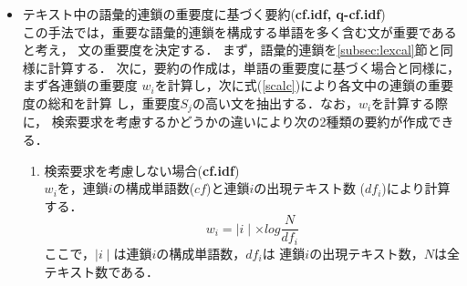 \begin{itemize}
テキスト中の単語の出現頻度から各単語の重要度を決定し，重要な単語を多く含む
文が重要であるという考えに基づき，文の重要度を計算する．
本稿ではZechner\cite{Zechner:96}と同様の手法を用いる．まず，テキスト中の各
単語の重要度$w_{i}$を計算する．次に，各文中の単語の重要度の総和を式
(\ref{scalc})により計算し，重要度$S_{j}$の高い文を抽出する．
	\begin{equation}\label{scalc}
		\displaystyle{S_{j}=\sum_{i} w_{i}}
		\end{equation}
この手法では，各単語の重要度$w_{i}$を計算する際に，検索要求を考慮
するかどうかの違いにより次の2種類の要約を作成できる．
	\begin{enumerate}
	\item 検索要求を考慮しない場合({\bf tf.idf})\\
	式(\ref{equ:tfidf})により，tf.idfを基に$w_{i}$を計算する．
	ただし，この場合の$tf_{i}$はテキスト内の単語$i$の出現頻度，$df_{i}$
	は単語$i$の出現するテキストの数，$N$は全テキスト数である．
	\item 検索要求を考慮する場合({\bf q-tf.idf})\\
	検索要求内の単語(検索語)には重み$\alpha$をかける\footnote
	{いくつかのテキストにおいて$\alpha$を2,3,4,5と変化させた予備的な実
	験で，重みをかけない場合との要約の違いが最も大きかった
	$3$を今回の$\alpha$の値とした．}．
	\begin{equation}\label{qb_tfidf}
	w_{i} =
	\left\{
        \begin{array}{rl}
	tf_{i}\times log\frac{N}{df_{i}} &\quad\mbox{検索語でない}\\
	\alpha\times tf_{i}\times log\frac{N}{df_{i}} &\quad\mbox{検索語}\\
        \end{array}\right.
	\end{equation}

検索要求を考慮した，従来の要約作成手法の多くは，この手法に基づいている
\cite{tombros:98:b,shiomi:98:a,hasui:98:a}．

	\end{enumerate}
\item テキスト中の語彙的連鎖の重要度に基づく要約({\bf cf.idf, q-cf.idf})\\
この手法では，重要な語彙的連鎖を構成する単語を多く含む文が重要であると考え，
文の重要度を決定する．
まず，語彙的連鎖を\ref{subsec:lexcal}節と同様に計算する．
次に，要約の作成は，単語の重要度に基づく場合と同様に，まず各連鎖の重要度
$w_{i}$を計算し，次に式(\ref{scalc})により各文中の連鎖の重要度の総和を計算
し，重要度$S_{j}$の高い文を抽出する．なお，$w_{i}$を計算する際に，
検索要求を考慮するかどうかの違いにより次の2種類の要約が作成できる．
	\begin{enumerate}
	\item 検索要求を考慮しない場合({\bf cf.idf})\\
	$w_{i}$を，連鎖$i$の構成単語数($cf$)と連鎖$i$の出現テキスト数
	($df_{i}$)により計算する．
		\begin{equation}\label{wchain_tfidf}
		\displaystyle{w_{i} = 
			\mid i\mid\times log\frac{N}{df_{i}}}
		\end{equation}
	ここで，$\mid i\mid$は連鎖$i$の構成単語数，$df_{i}$は
	連鎖$i$の出現テキスト数，$N$は全テキスト数である．


\end{enumerate}
\end{itemize}

